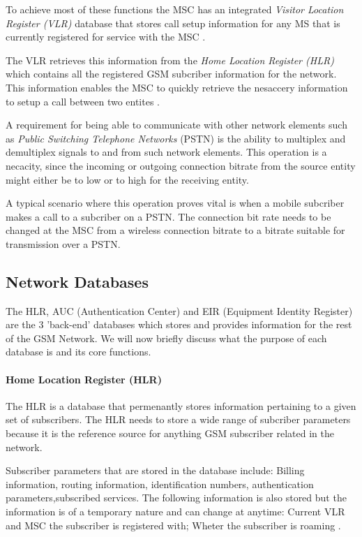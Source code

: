 To achieve most of these functions the MSC has an integrated \emph{Visitor Location Register (VLR)} database that stores call setup information for any MS that is currently registered for service with the MSC \cite{GSM92,wirelesstelcoMullet}. 

The VLR retrieves this information from the \emph{Home Location Register (HLR)} which contains all the registered GSM subcriber information for the network. This information enables the MSC to quickly retrieve the nesaccery information to setup a call between two entites \cite{GSMSysEngin,GSMSecurInTeleNetwork}.

A requirement for being able to communicate with other network elements such as \emph{Public Switching Telephone Networks} (PSTN) is the ability to multiplex and demultiplex signals to and from such network elements. This operation is a necacity, since the incoming or outgoing connection bitrate from the source entity might either be to low or to high for the receiving entity.

A typical scenario where this operation proves vital is when a mobile subcriber makes a call to a subcriber on a PSTN. The connection bit rate needs to be changed at the MSC from a wireless connection bitrate to a bitrate suitable for transmission over a PSTN.

\subsection{Network Databases}
The HLR, AUC (Authentication Center) and EIR (Equipment Identity Register) are the 3 'back-end' databases which stores and provides information for the rest of the GSM Network. We will now briefly discuss what the purpose of each database is and its core functions.

\paragraph{Home Location Register (HLR)}
The HLR is a database that permenantly stores information pertaining to a given set of subscribers. The HLR needs to store a wide range of subcriber parameters because it is the reference source for anything GSM subscriber related in the network. 

Subscriber parameters that are stored in the database include: Billing information, routing information, identification numbers, authentication parameters,subscribed services. The following information is also stored but the information is of a temporary nature and can change at anytime: Current VLR and MSC the subscriber is registered with; Wheter the subscriber is roaming \cite{GSMSysEngin}.

